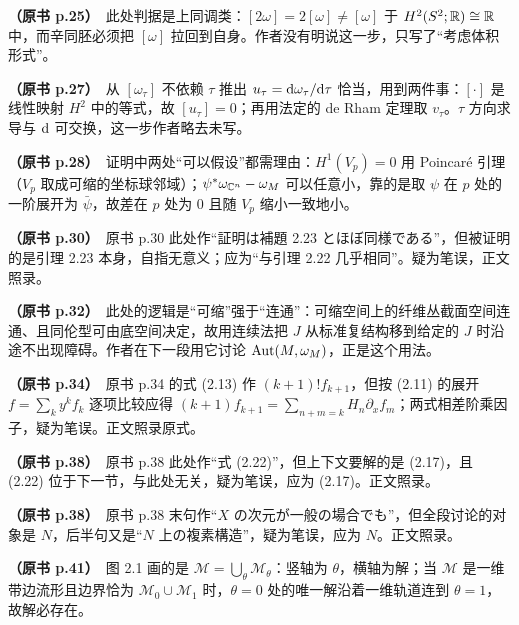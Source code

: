 \noindent \textbf{（原书 p.25）}\ 此处判据是上同调类：$[2\omega]=2[\omega]\neq[\omega]$ 于 $H^2(S^2;\mathbb{R})\cong\mathbb{R}$ 中，而辛同胚必须把 $[\omega]$ 拉回到自身。作者没有明说这一步，只写了“考虑体积形式”。\par\smallskip

\noindent \textbf{（原书 p.27）}\ 从 $[\omega_\tau]$ 不依赖 $\tau$ 推出 $u_\tau=\mathrm{d}\omega_\tau/\mathrm{d}\tau$ 恰当，用到两件事：$[\cdot]$ 是线性映射 $H^2$ 中的等式，故 $[u_\tau]=0$；再用法定的 de Rham 定理取 $v_\tau$。$\tau$ 方向求导与 $\mathrm{d}$ 可交换，这一步作者略去未写。\par\smallskip

\noindent \textbf{（原书 p.28）}\ 证明中两处“可以假设”都需理由：$H^1(V_p)=0$ 用 Poincaré 引理（$V_p$ 取成可缩的坐标球邻域）；$\psi^*\omega_{\mathbb{C}^n}-\omega_M$ 可以任意小，靠的是取 $\psi$ 在 $p$ 处的一阶展开为 $\bar\psi$，故差在 $p$ 处为 0 且随 $V_p$ 缩小一致地小。\par\smallskip

\noindent \textbf{（原书 p.30）}\ 原书 p.30 此处作“証明は補題 2.23 とほぼ同様である”，但被证明的是引理 2.23 本身，自指无意义；应为“与引理 2.22 几乎相同”。疑为笔误，正文照录。\par\smallskip

\noindent \textbf{（原书 p.32）}\ 此处的逻辑是“可缩”强于“连通”：可缩空间上的纤维丛截面空间连通、且同伦型可由底空间决定，故用连续法把 $J$ 从标准复结构移到给定的 $J$ 时沿途不出现障碍。作者在下一段用它讨论 $\operatorname{Aut}(M,\omega_M)$，正是这个用法。\par\smallskip

\noindent \textbf{（原书 p.34）}\ 原书 p.34 的式 (2.13) 作 $(k+1)!f_{k+1}$，但按 (2.11) 的展开 $f=\sum_k y^kf_k$ 逐项比较应得 $(k+1)f_{k+1}=\sum_{n+m=k}H_n\partial_xf_m$；两式相差阶乘因子，疑为笔误。正文照录原式。\par\smallskip

\noindent \textbf{（原书 p.38）}\ 原书 p.38 此处作“式 (2.22)”，但上下文要解的是 (2.17)，且 (2.22) 位于下一节，与此处无关，疑为笔误，应为 (2.17)。正文照录。\par\smallskip

\noindent \textbf{（原书 p.38）}\ 原书 p.38 末句作“$X$ の次元が一般の場合でも”，但全段讨论的对象是 $N$，后半句又是“$N$ 上の複素構造”，疑为笔误，应为 $N$。正文照录。\par\smallskip

\noindent \textbf{（原书 p.41）}\ 图 2.1 画的是 $\mathcal{M}=\bigcup_\theta\mathcal{M}_\theta$：竖轴为 $\theta$，横轴为解；当 $\mathcal{M}$ 是一维带边流形且边界恰为 $\mathcal{M}_0\cup\mathcal{M}_1$ 时，$\theta=0$ 处的唯一解沿着一维轨道连到 $\theta=1$，故解必存在。\par\smallskip


